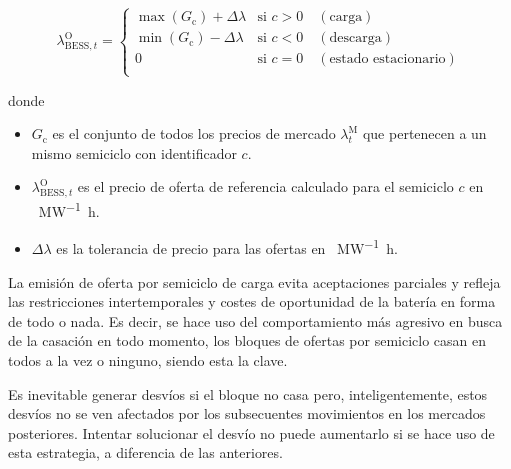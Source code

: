 \begin{samepage}

  \begin{equation}
    \lambda^{\mathrm{O}}_{\mathrm{BESS}, t} =
    \begin{cases}
      \max\left(G_{\mathrm{c}}\right) + \Delta \lambda & \text{si } c > 0 \quad (\text{carga})    \\
      \min\left(G_{\mathrm{c}}\right) - \Delta \lambda & \text{si } c < 0 \quad (\text{descarga}) \\
      0                                     & \text{si } c = 0 \quad (\text{estado estacionario}) \\
    \end{cases}
  \end{equation}

  donde

  \begin{itemize}

    \item \( G_{\mathrm{c}} \) es el conjunto de todos los precios de mercado \( \lambda^{\mathrm{M}}_{t} \) que pertenecen a un mismo semiciclo con identificador \( c \).

    \item \( \lambda^{\mathrm{O}}_{\mathrm{BESS}, t} \) es el precio de oferta de referencia calculado para el semiciclo \( c \) en \si{\text{\euro}\per\mega\watt\hour}.

    \item \( \Delta \lambda \) es la tolerancia de precio para las ofertas en \si{\text{\euro}\per\mega\watt\hour}.

  \end{itemize}

\end{samepage}

La emisión de oferta por semiciclo de carga evita aceptaciones parciales y refleja las restricciones intertemporales y costes de oportunidad de la batería en forma de todo o nada. Es decir, se hace uso del comportamiento más agresivo en busca de la casación en todo momento, los bloques de ofertas por semiciclo casan en todos a la vez o ninguno, siendo esta la clave.

Es inevitable generar desvíos si el bloque no casa pero, inteligentemente, estos desvíos no se ven afectados por los subsecuentes movimientos en los mercados posteriores. Intentar solucionar el desvío no puede aumentarlo si se hace uso de esta estrategia, a diferencia de las anteriores.

